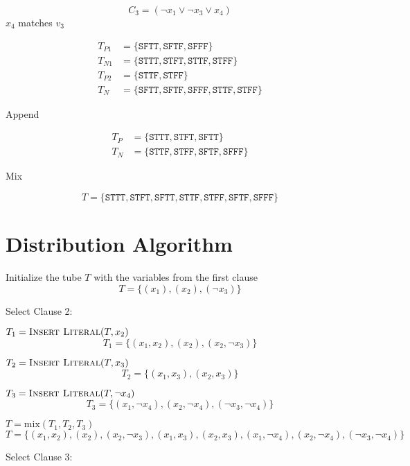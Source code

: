 \[
C_3 = (\neg x_1 \vee \neg x_3 \vee x_4)
\]
\noindent $x_4$ matches $v_3$

\begin{align*}
T_{P1} &= \{\texttt{SFTT}, \texttt{SFTF}, \texttt{SFFF}\}\\
T_{N1} &= \{\texttt{STTT}, \texttt{STFT}, \texttt{STTF}, \texttt{STFF}\}\\
T_{P2} &= \{\texttt{STTF}, \texttt{STFF}\}\\
T_N &= \{\texttt{SFTT}, \texttt{SFTF}, \texttt{SFFF}, \texttt{STTF}, \texttt{STFF}\}
\end{align*}

\noindent Append

\begin{align*}
T_P &= \{\texttt{STTT}, \texttt{STFT}, \texttt{SFTT}\}\\
T_N &= \{\texttt{STTF}, \texttt{STFF}, \texttt{SFTF}, \texttt{SFFF}\}
\end{align*}

\noindent Mix

\[
T = \{\texttt{STTT}, \texttt{STFT}, \texttt{SFTT}, \texttt{STTF}, \texttt{STFF}, \texttt{SFTF}, \texttt{SFFF}\}
\]


\section{Distribution Algorithm}

Initialize the tube $T$ with the variables from the first clause
\[
	T = \{(x_1), (x_2), (\neg x_3)\}
\]	

\noindent Select Clause 2:

\par $T_1 =	\text{{\sc Insert Literal}}(T, x_2)$
\[
		T_1 =  \{(x_1,x_2), (x_2), (x_2,\neg x_3)\}
\]
\par $T_2 =	\text{{\sc Insert Literal}}(T, x_3)$
\[	
		T_2 =  \{(x_1,x_3), (x_2,x_3)\}	
\]
\par $T_3 =	\text{{\sc Insert Literal}}(T, \neg x_4)$
\[	
		T_3 =  \{(x_1,\neg x_4), (x_2,\neg x_4), (\neg x_3,\neg x_4)\}			
\]		
\par $T = \text{mix}(T_1, T_2, T_3)$
\[	
		T = \{(x_1,x_2), (x_2), (x_2,\neg x_3), (x_1, x_3), (x_2,x_3), (x_1,\neg x_4), (x_2,\neg x_4), (\neg x_3,\neg x_4)\}
\]		

\noindent Select Clause 3:
	
